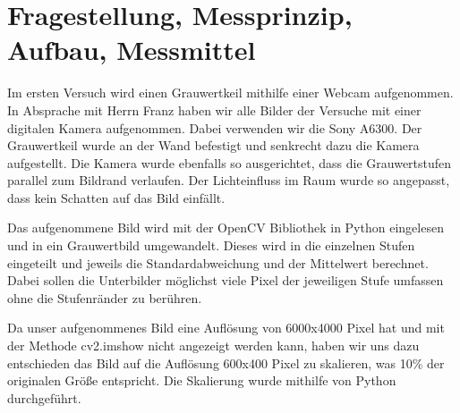 \documentclass[12pt, oneside, a4paper, \docLanguage]{report}
\begin{document}
\section{Fragestellung, Messprinzip, Aufbau, Messmittel}
\label{chap:VERSUCH_1_FRAGESTELLUNG}
Im ersten Versuch wird einen Grauwertkeil mithilfe einer Webcam aufgenommen. In Absprache mit Herrn Franz haben wir alle Bilder der Versuche mit einer digitalen Kamera aufgenommen. Dabei verwenden wir die Sony A6300. Der Grauwertkeil wurde an der Wand befestigt und senkrecht dazu die Kamera aufgestellt. Die Kamera wurde ebenfalls so ausgerichtet, dass die Grauwertstufen parallel zum Bildrand verlaufen. Der Lichteinfluss im Raum wurde so angepasst, dass kein Schatten auf das Bild einfällt.

Das aufgenommene Bild wird mit der OpenCV Bibliothek in Python eingelesen und in ein Grauwertbild umgewandelt. Dieses wird in die einzelnen Stufen eingeteilt und jeweils die Standardabweichung und der Mittelwert berechnet. Dabei sollen die Unterbilder möglichst viele Pixel der jeweiligen Stufe umfassen ohne die Stufenränder zu berühren.

Da unser aufgenommenes Bild eine Auflösung von 6000x4000 Pixel hat und mit der Methode cv2.imshow nicht angezeigt werden kann, haben wir uns dazu entschieden das Bild auf die Auflösung 600x400 Pixel zu skalieren, was 10\% der originalen Größe entspricht. Die Skalierung wurde mithilfe von Python durchgeführt.
\end{document}
